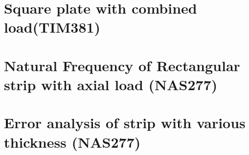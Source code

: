 \documentclass[a4paper]{article}
\begin{document}
%



\section{Square plate with combined load(TIM381)}

%



\section{Natural Frequency of Rectangular strip with axial load (NAS277)}

%




\section{Error analysis of strip with various thickness (NAS277)}

%


\end{document}
